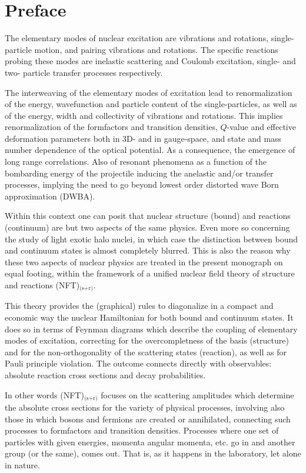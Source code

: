  \chapter*{Preface}
The elementary modes of nuclear excitation are vibrations and rotations, single-particle  motion, and pairing vibrations and rotations. The specific reactions probing these modes are inelastic scattering and Coulomb excitation,  single- and two- particle transfer processes respectively. 

The interweaving of the elementary modes of excitation lead to renormalization of the energy, wavefunction and particle content of the single-particles, as well as of the energy, width and collectivity of vibrations and rotations. This implies renormalization of the formfactors and transition densities, $Q$-value and effective deformation parameters both in 3D- and in gauge-space, and state and mass number dependence of the optical potential. As a consequence, the emergence of long range correlations. Also of resonant phenomena as a function of the bombarding energy of the projectile inducing the anelastic and/or transfer processes, implying  the need to go beyond lowest order distorted wave Born approximation (DWBA).

Within this context one can posit that nuclear structure (bound) and reactions (continuum) are but two aspects of the same physics.  Even more so concerning the study of light exotic halo nuclei, in which case the distinction between bound and continuum states is almost completely blurred. This is also the reason why these two aspects of nuclear physics are treated in the present monograph on equal footing,  within the framework of a unified nuclear field theory of structure and reactions (NFT)$_\text{(s+r)}$. 


This theory provides the (graphical) rules to diagonalize in a compact and economic way the nuclear Hamiltonian for both bound and continuum states. It does so in terms of Feynman diagrams which describe the coupling of elementary modes of excitation, correcting for the overcompletness of the basis  (structure) and for the  non-orthogonality of the scattering states (reaction), as well as for Pauli principle violation. The outcome connects directly with observables: absolute reaction cross sections and decay probabilities. 


In other words (NFT)$_\text{(s+r)}$ focuses on the scattering amplitudes which determine the absolute cross sections for the variety of physical processes, involving also those in which bosons and fermions are created or annihilated, connecting such processes to formfactors and transition densities. Processes where one set of particles with given energies, momenta angular momenta, etc. go in and another group (or the same), comes out. That is, as it happens in the laboratory, let alone in nature.

